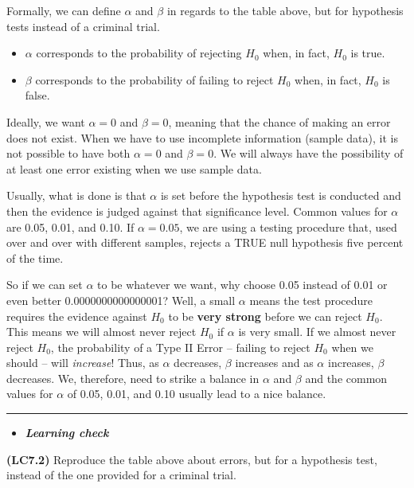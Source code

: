 \documentclass[]{tufte-book}
\let\oldrule=\rule
\renewcommand{\rule}[1]{\oldrule{\linewidth}}
\providecommand{\tightlist}{%
  \setlength{\itemsep}{0pt}\setlength{\parskip}{0pt}}
\newenvironment{rmdblock}[1]
  {\begin{shaded*}
  \begin{itemize}
  \renewcommand{\labelitemi}{
    \raisebox{-.7\height}[0pt][0pt]{
    }
  }
  \item
  }
  {
  \end{itemize}
  \end{shaded*}
  }
\newenvironment{learncheck}
  {\begin{rmdblock}{warning}}
  {\end{rmdblock}}
\begin{document}
Formally, we can define \(\alpha\) and \(\beta\) in regards to the table
above, but for hypothesis tests instead of a criminal trial.

\begin{itemize}
\tightlist
\item
  \(\alpha\) corresponds to the probability of rejecting \(H_0\) when,
  in fact, \(H_0\) is true.
\item
  \(\beta\) corresponds to the probability of failing to reject \(H_0\)
  when, in fact, \(H_0\) is false.
\end{itemize}

Ideally, we want \(\alpha = 0\) and \(\beta = 0\), meaning that the
chance of making an error does not exist. When we have to use incomplete
information (sample data), it is not possible to have both
\(\alpha = 0\) and \(\beta = 0\). We will always have the possibility of
at least one error existing when we use sample data.

Usually, what is done is that \(\alpha\) is set before the hypothesis
test is conducted and then the evidence is judged against that
significance level. Common values for \(\alpha\) are 0.05, 0.01, and
0.10. If \(\alpha = 0.05\), we are using a testing procedure that, used
over and over with different samples, rejects a TRUE null hypothesis
five percent of the time.

So if we can set \(\alpha\) to be whatever we want, why choose 0.05
instead of 0.01 or even better 0.0000000000000001? Well, a small
\(\alpha\) means the test procedure requires the evidence against
\(H_0\) to be \textbf{very strong} before we can reject \(H_0\). This
means we will almost never reject \(H_0\) if \(\alpha\) is very small.
If we almost never reject \(H_0\), the probability of a Type II Error --
failing to reject \(H_0\) when we should -- will \emph{increase}! Thus,
as \(\alpha\) decreases, \(\beta\) increases and as \(\alpha\)
increases, \(\beta\) decreases. We, therefore, need to strike a balance
in \(\alpha\) and \(\beta\) and the common values for \(\alpha\) of
0.05, 0.01, and 0.10 usually lead to a nice balance.

\begin{center}\rule{0.5\linewidth}{\linethickness}\end{center}

\begin{learncheck}
\textbf{\emph{Learning check}}
\end{learncheck}

\textbf{(LC7.2)} Reproduce the table above about errors, but for a
hypothesis test, instead of the one provided for a criminal trial.
\end{document}
